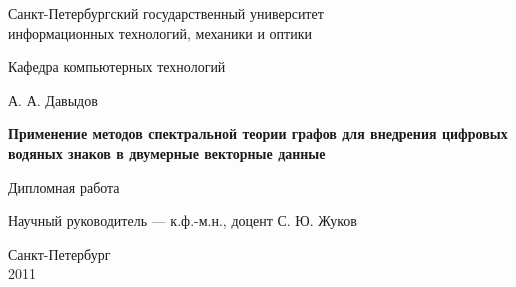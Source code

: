 \pagestyle{title}

\begin{center}
Санкт-Петербургский государственный университет \\ информационных технологий, механики и оптики

\vspace{2cm}

Кафедра компьютерных технологий

\vspace{3cm}

{\Large А. А. Давыдов}

\vspace{2cm}

\vbox{\LARGE\bfseries
Применение методов спектральной теории графов для внедрения цифровых водяных знаков в двумерные векторные данные}
\vspace{4cm}

Дипломная работа 

\vspace{1cm}

{\Large Научный руководитель --- к.ф.-м.н., доцент С. Ю. Жуков}

\vspace{5cm}

Санкт-Петербург\\ 2011
\end{center}
